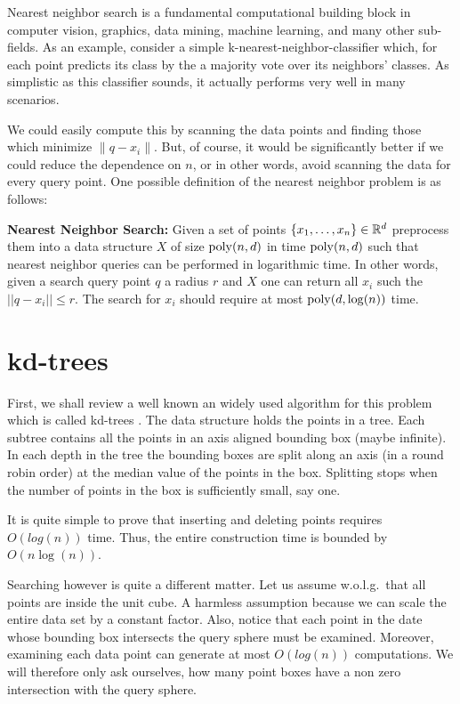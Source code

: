 \documentclass{article}
\begin{document}
Nearest neighbor search is a fundamental computational building block in computer vision, graphics, data mining, machine learning, and many other sub-fields.
As an example, consider a simple k-nearest-neighbor-classifier which, for each point predicts its class
by the a majority vote over its neighbors' classes. As simplistic as this classifier sounds, it actually performs 
very well in many scenarios. 


We could easily compute this by scanning the data points and finding those which minimize $\|q - x_i\|$.
But, of course, it would be significantly better if we could reduce the dependence on $n$, or in other words, avoid scanning the data for every query point.
One possible definition of the nearest neighbor problem is as follows:
\begin{definition}{\bf Nearest Neighbor Search:} Given a set of points $\{x_1,\ldots,x_n\} \in {\mathbb{R}}^{d}$ 
preprocess them into a data structure
$X$ of size ${\operatorname{poly}}(n,d)$ in time ${\operatorname{poly}}(n,d)$ such that nearest neighbor queries can
be performed in logarithmic time. In other words, given a search query point $q$ a radius $r$ and $X$ one can 
return all $x_i$ such the $||q - x_i || \le r$. The search for $x_i$ should require at most ${\operatorname{poly}}(d,\log(n))$ time.
\end{definition}


\section{kd-trees}
First, we shall review a well known an widely used algorithm for this problem which is called kd-trees \cite{Bentley75}.
The data structure holds the points in a tree. 
Each subtree contains all the points in an axis aligned bounding box (maybe infinite).
In each depth in the tree the bounding boxes are split along an axis (in a round robin order) at the median value of the points in the box.
Splitting stops when the number of points in the box is sufficiently small, say one. 


It is quite simple to prove that inserting and deleting points requires $O(log(n))$ time.
Thus, the entire construction time is bounded by $O(n\log(n))$.

Searching however is quite a different matter.
Let us assume w.o.l.g.\ that all points are inside the unit cube. 
A harmless assumption because we can scale the entire data set by a constant factor.
Also, notice that each point in the date whose bounding box intersects the query sphere must be
examined. Moreover, examining each data point can generate at most $O(log(n))$ computations.
We will therefore only ask ourselves, how many point boxes have a non zero intersection with the query sphere.
\end{document}
